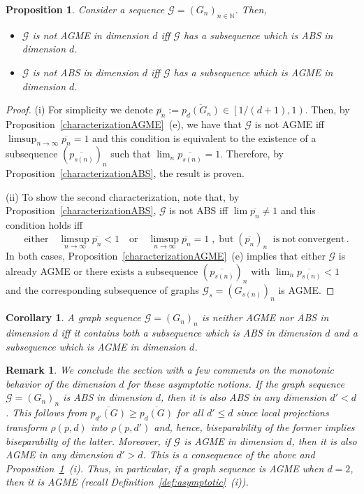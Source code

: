 \documentclass[a4paper,onecolumn,accepted=2024-12-14]{quantumarticle}
\newtheorem{proposition}[theorem]{Proposition}
\newtheorem{corollary}[theorem]{Corollary}
\newtheorem{remark}[theorem]{Remark}%
\theoremstyle{plain}
\newcommand{\cG}{{\mathcal G}}         %
\newcommand{\N}{\mathbb{N}} %
\newcommand{\quadtext}[1]{\quad\text{#1}\quad}
\begin{document}
\begin{proposition}\label{prop:notAGMEnotABS}
Consider a sequence $\cG=(G_n)_{n\in\N}$. Then,
\begin{itemize}
\item[(i)] $\cG$ is not AGME in dimension $d$ iff $\cG$ has a subsequence which is ABS in dimension $d$.
\item[(ii)] $\cG$ is not ABS in dimension $d$ iff $\cG$ has a subsequence which is AGME in dimension $d$.
\end{itemize}
\end{proposition}
\begin{proof}
(i) For simplicity we denote
$\overline{p_n}:=\overline{p_d(G_n)}\in\left[{1}/{(d+1)},1\right)$. Then, by
Proposition~\ref{characterizationAGME}~(e), we have that $\cG$ is not AGME iff $\limsup_{n\to\infty}\overline{p_n}=1$
and this condition is equivalent to the existence of a subsequence
$\left(\overline{p_{s(n)}}\right)_n$ such that $\lim_n\overline{p_{s(n)}}=1$. Therefore, by Proposition~\ref{characterizationABS}, the result is proven.

(ii) To show the second characterization, note that, by Proposition~\ref{characterizationABS}, $\cG$ is not ABS iff
$\lim\overline{p_n}\not=1$ and this condition holds iff
\begin{equation}
 \quadtext{either}
 \limsup_{n\to\infty}\overline{p_n}<1 \quadtext{or}
 \limsup_{n\to\infty}\overline{p_n}=1\;,\;\mathrm{but}\;
 \left(\overline{p_n}\right)_n\;\;\mathrm{is~not~convergent}\,.
\end{equation}
In both cases, Proposition~\ref{characterizationAGME}~(e) implies that either
$\cG$ is already AGME or there exists a subsequence $\left(\overline{p_{s(n)}}
\right)_n$ with $\lim_n\overline{p_{s(n)}}<1$ and the corresponding subsequence of graphs $\cG_s=(G_{s(n)})_n$ is AGME.
\end{proof}


\begin{corollary}
A graph sequence $\cG=(G_n)_n$ is neither AGME nor ABS in dimension $d$ iff it contains both a subsequence which is ABS in dimension $d$ and a subsequence which is AGME in dimension $d$.
\end{corollary}

\begin{remark}
We conclude the section with a few comments on the monotonic behavior of the dimension $d$ for these asymptotic notions. If the graph sequence $\cG=(G_n)_n$ is ABS in dimension $d$, then it is also ABS in any dimension $d'<d$. This follows from
$\overline{p_{d'}(G)}\geq\overline{p_d(G)}$ for all $d'\leq d$
since local projections transform $\rho(p,d)$ into $\rho(p,d')$ and, hence, biseparability of the former implies biseparabilty of the latter.
Moreover, if $\cG$ is AGME in dimension $d$, then it is also AGME in any dimension $d'>d$.
This is a consequence of the above and Proposition~\ref{prop:notAGMEnotABS}~(i). Thus, in particular, if a graph sequence is AGME when $d=2$, then it is AGME
(recall Definition~\ref{def:asymptotic}~(i)).
\end{remark}
\end{document}
